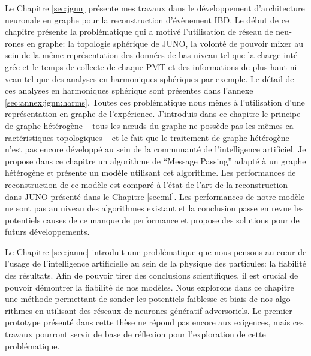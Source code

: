 \documentclass[../main.tex]{subfiles}
\begin{document}
\begin{otherlanguage}{french}
Le Chapitre \ref{sec:jgnn} présente mes travaux dans le développement d'architecture neuronale en graphe pour la reconstruction d'évènement IBD. Le début de ce chapitre présente la problématique qui a motivé l'utilisation de réseau de neurones en graphe: la topologie sphérique de JUNO, la volonté de pouvoir mixer au sein de la même représentation des données de bas niveau tel que la charge intégrée et le temps de collecte de chaque PMT et des informations de plus haut niveau tel que des analyses en harmoniques sphériques par exemple. Le détail de ces analyses en harmoniques sphérique sont présentes dans l'annexe \ref{sec:annex:jgnn:harms}. Toutes ces problématique nous mènes à l'utilisation d'une représentation en graphe de l'expérience. J'introduis dans ce chapitre le principe de graphe hétérogène -- tous les n\oe{}uds du graphe ne possède pas les mêmes caractéristiques topologiques -- et le fait que le traitement de graphe hétérogène n'est pas encore développé au sein de la communauté de l'intelligence artificiel. Je propose dans ce chapitre un algorithme de ``Message Passing'' adapté à un graphe hétérogène et présente un modèle utilisant cet algorithme. Les performances de reconstruction de ce modèle est comparé à l'état de l'art de la reconstruction dans JUNO présenté dans le Chapitre \ref{sec:ml}. Les performances de notre modèle ne sont pas au niveau des algorithmes existant et la conclusion passe en revue les potentiels causes de ce manque de performance et propose des solutions pour de futurs développements.

Le Chapitre \ref{sec:janne} introduit une problématique que nous pensons au c\oe{}ur de l'usage de l'intelligence artificielle au sein de la physique des particules: la fiabilité des résultats. Afin de pouvoir tirer des conclusions scientifiques, il est crucial de pouvoir démontrer la fiabilité de nos modèles. Nous explorons dans ce chapitre une méthode permettant de sonder les potentiels faiblesse et biais de nos algorithmes en utilisant des réseaux de neurones génératif adversoriels. Le premier prototype présenté dans cette thèse ne répond pas encore aux exigences, mais ces travaux pourront servir de base de réflexion pour l'exploration de cette problématique.


\end{otherlanguage}
\end{document}
